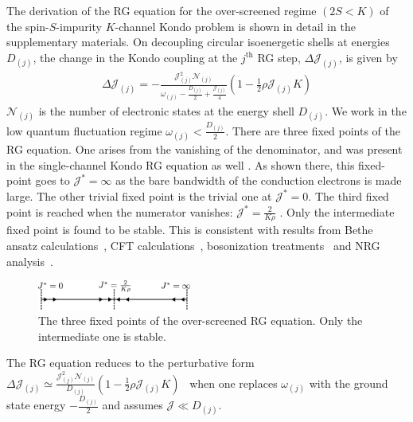 \documentclass[reprint,prb,superscriptaddress]{revtex4-2}
\begin{document}
The derivation of the RG equation for the over-screened regime \((2S < K)\) of the spin-\(S\)-impurity \(K\)-channel Kondo problem is shown in detail in the supplementary materials.
On decoupling circular isoenergetic shells at energies \(D_{(j)}\), the change in the Kondo coupling at the \(j^\text{th}\) RG step, \(\Delta {\mathcal{J}}_{(j)}\), is given by
\begin{equation}\begin{aligned}
	\Delta {\mathcal{J}}_{(j)} = -\frac{{\mathcal{J}}_{(j)}^2 \mathcal{N}_{(j)}}{\omega_{(j)} - \frac{D_{(j)}}{2} + \frac{{\mathcal{J}}_{(j)}}{4}}\left( 1 - \frac{1}{2}\rho {\mathcal{J}}_{(j)} K \right) 
\end{aligned}\end{equation}
\(\mathcal{N}_{(j)}\) is the number of electronic states at the energy shell \(D_{(j)}\). We work in the low quantum fluctuation regime \(\omega_{(j)} < \frac{D_{(j)}}{2}\). There are three fixed points of the RG equation. One arises from the vanishing of the denominator, and was present in the single-channel Kondo RG equation as well \cite{kondo_urg}. As shown there, this fixed-point goes to \({\mathcal{J}}^* = \infty\) as the bare bandwidth of the conduction electrons is made large. The other trivial fixed point is the trivial one at \({\mathcal{J}}^* = 0\). The third fixed point is reached when the numerator vanishes: \({\mathcal{J}}^* = \frac{2}{K \rho}\) \cite{Gan_mchannel_1994,Kogan_2018,Kuramoto1998,Noz_blandin_1980}. Only the intermediate fixed point is found to be stable. This is consistent with results from Bethe ansatz calculations~\cite{Tsvelick_Weigmann_mchannel_1984,andrei_destri_1984,zarand_costi_2002,andrei_jerez_1995,Tsvelick_1985,Tsvelick1984}, CFT calculations~\cite{affleck_1991_overscreen,affleck1993exact,affleck_ludwig_1991}, bosonization treatments~\cite{emery_kivelson,vondelft_prl_1998} and NRG analysis~\cite{pang_cox_1991,mitchell_bulla_2014}.
\begin{figure}[htpb]
	\centering
	\includegraphics[width=0.45\textwidth]{plt/rg_flow.pdf}
	\caption{The three fixed points of the over-screened RG equation. Only the intermediate one is stable.}
	\label{rg_flow}
\end{figure}

The RG equation reduces to the perturbative form \(\Delta {\mathcal{J}}_{(j)} \simeq \frac{{\mathcal{J}}_{(j)}^2 \mathcal{N}_{(j)}}{D_{(j)}}\left( 1 - \frac{1}{2}\rho {\mathcal{J}}_{(j)} K \right)\)~\cite{Kogan_2018,Kuramoto1998,Noz_blandin_1980,tripathi2018landau} when one replaces \(\omega_{(j)}\) with the ground state energy \(-\frac{D_{(j)}}{2}\) and assumes \({\mathcal{J}} \ll D_{(j)}\).
\end{document}
